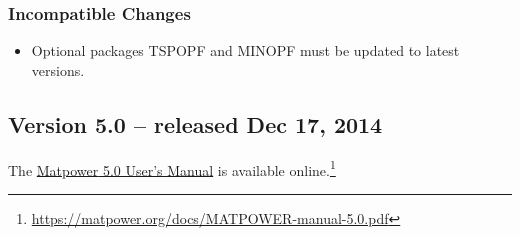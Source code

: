 \documentclass[12pt]{article}
\newcommand{\matpower}[0]{{\sc Matpower}}
\numberwithin{equation}{section}
\numberwithin{table}{section}
\numberwithin{figure}{section}
\begin{document}
\begin{appendices}
\subsubsection*{Incompatible Changes}
\begin{itemize}
\item Optional packages TSPOPF and MINOPF must be updated to latest versions.
\end{itemize}


\pagebreak
\subsection{Version 5.0 -- released Dec 17, 2014}
\label{app:v50}

The \href{https://matpower.org/docs/MATPOWER-manual-5.0.pdf}{\matpower{} 5.0 User's Manual} is available online.\footnote{\url{https://matpower.org/docs/MATPOWER-manual-5.0.pdf}}


\end{appendices}
\end{document}
